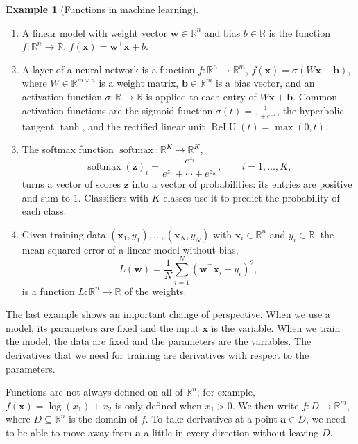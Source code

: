 \documentclass[11pt]{article}
\theoremstyle{definition}
\newtheorem{example}[definition]{Example}
\theoremstyle{plain}
\theoremstyle{remark}
\DeclareMathOperator{\softmax}{softmax}
\DeclareMathOperator{\ReLU}{ReLU}
\begin{document}
\begin{example}[Functions in machine learning]\label{ex:ml-functions}
    \begin{enumerate}
        \item A linear model with weight vector $\mathbf{w} \in \mathbb{R}^n$ and bias $b \in \mathbb{R}$ is the function $f: \mathbb{R}^n \to \mathbb{R}$, $f(\mathbf{x}) = \mathbf{w}^\top \mathbf{x} + b$.
        \item A layer of a neural network is a function $f: \mathbb{R}^n \to \mathbb{R}^m$, $f(\mathbf{x}) = \sigma(W\mathbf{x} + \mathbf{b})$, where $W \in \mathbb{R}^{m \times n}$ is a weight matrix, $\mathbf{b} \in \mathbb{R}^m$ is a bias vector, and an activation function $\sigma: \mathbb{R} \to \mathbb{R}$ is applied to each entry of $W\mathbf{x} + \mathbf{b}$. Common activation functions are the sigmoid function $\sigma(t) = \frac{1}{1 + e^{-t}}$, the hyperbolic tangent $\tanh$, and the rectified linear unit $\ReLU(t) = \max(0, t)$.
        \item The softmax function $\softmax: \mathbb{R}^K \to \mathbb{R}^K$,
        \[\softmax(\mathbf{z})_i = \frac{e^{z_i}}{e^{z_1} + \cdots + e^{z_K}}, \qquad i = 1, \ldots, K,\]
        turns a vector of scores $\mathbf{z}$ into a vector of probabilities: its entries are positive and sum to $1$. Classifiers with $K$ classes use it to predict the probability of each class.
        \item Given training data $(\mathbf{x}_1, y_1), \ldots, (\mathbf{x}_N, y_N)$ with $\mathbf{x}_i \in \mathbb{R}^n$ and $y_i \in \mathbb{R}$, the mean squared error of a linear model without bias,
        \[L(\mathbf{w}) = \frac{1}{N} \sum_{i=1}^N (\mathbf{w}^\top \mathbf{x}_i - y_i)^2,\]
        is a function $L: \mathbb{R}^n \to \mathbb{R}$ of the weights.
    \end{enumerate}
\end{example}

The last example shows an important change of perspective. When we use a model, its parameters are fixed and the input $\mathbf{x}$ is the variable. When we train the model, the data are fixed and the parameters are the variables. The derivatives that we need for training are derivatives with respect to the parameters.

Functions are not always defined on all of $\mathbb{R}^n$; for example, $f(\mathbf{x}) = \log(x_1) + x_2$ is only defined when $x_1 > 0$. We then write $f: D \to \mathbb{R}^m$, where $D \subseteq \mathbb{R}^n$ is the domain of $f$. To take derivatives at a point $\mathbf{a} \in D$, we need to be able to move away from $\mathbf{a}$ a little in every direction without leaving $D$.
\end{document}
